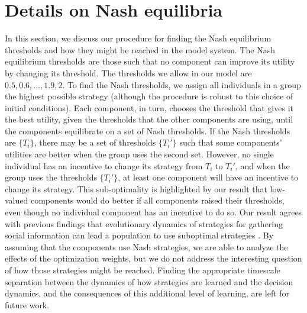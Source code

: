 \documentclass{article}
\begin{document}
\section{Details on Nash equilibria \label{nash_supp}}
In this section, we discuss our procedure for finding the Nash equilibrium thresholds and how they might be reached in the model system. The Nash equilibrium thresholds are those such that no component can improve its utility by changing its threshold. The thresholds we allow in our model are $0.5,0.6,\dots,1.9,2$. To find the Nash thresholds, we assign all individuals in a group the highest possible strategy (although the procedure is robust to this choice of initial conditions). Each component, in turn, chooses the threshold that gives it the best utility, given the thresholds that the other components are using, until the components equilibrate on a set of Nash thresholds. If the Nash thresholds are $\{T_i\}$, there may be a set of thresholds $\{T_i'\}$ such that some components' utilities are better when the group uses the second set. However, no single individual has an incentive to change its strategy from $T_i$ to $T_i'$, and when the group uses the thresholds $\{T_i'\}$, at least one component will have an incentive to change its strategy. This sub-optimality is highlighted by our result that low-valued components would do better if all components raised their thresholds, even though no individual component has an incentive to do so. Our result agrees with previous findings that evolutionary dynamics of strategies for gathering social information can lead a population to use suboptimal strategies \cite{Torney:2015fk}.  By assuming that the components use Nash strategies, we are able to analyze the effects of the optimization weights, but we do not address the interesting question of how those strategies might be reached. Finding the appropriate timescale separation between the dynamics of how strategies are learned and the decision dynamics, and the consequences of this additional level of learning, are left for future work. 
\end{document}
